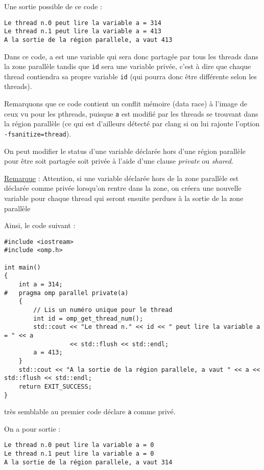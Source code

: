 \documentclass[fleqn,11pt]{article}
\begin{document}
Une sortie possible de ce code :
\begin{verbatim}
Le thread n.0 peut lire la variable a = 314
Le thread n.1 peut lire la variable a = 413
A la sortie de la région parallele, a vaut 413
\end{verbatim}

Dans ce code, a est une variable qui sera donc partagée par tous les threads dans la zone parallèle
tandis que \texttt{id} sera une variable privée, c'est à dire que chaque thread contiendra sa propre
variable \texttt{id} (qui pourra donc être différente selon les threads).

Remarquons que ce code contient un conflit mémoire (data race) à l'image de ceux vu pour les pthreads,
puisque \texttt{a} est modifié par les threads se trouvant dans la région parallèle (ce qui est d'ailleurs
détecté par clang si on lui rajoute l'option \texttt{-fsanitize=thread}).

On peut modifier le status d'une variable déclarée hors d'une région parallèle pour être soit partagée soit  privée à l'aide d'une clause \textsl{private} ou \textsl{shared}.

\underline{Remarque} : Attention, si une variable déclarée hors de la zone parallèle est déclarée comme
privée lorsqu'on rentre dans la zone, on créera une nouvelle variable pour chaque thread qui seront ensuite
perdues à la sortie de la zone parallèle

Ainsi, le code suivant :
\begin{lstlisting}
#include <iostream>
#include <omp.h>

int main()
{
    int a = 314;
#   pragma omp parallel private(a)
    {
        // Lis un numéro unique pour le thread
        int id = omp_get_thread_num();
        std::cout << "Le thread n." << id << " peut lire la variable a = " << a 
                  << std::flush << std::endl;
        a = 413;
    }
    std::cout << "A la sortie de la région parallele, a vaut " << a << std::flush << std::endl;
    return EXIT_SUCCESS;
}
\end{lstlisting}

très semblable au premier code déclare \texttt{a} comme privé. 

On a pour sortie :
\begin{verbatim}
Le thread n.0 peut lire la variable a = 0
Le thread n.1 peut lire la variable a = 0
A la sortie de la région parallele, a vaut 314
\end{verbatim}
\end{document}
